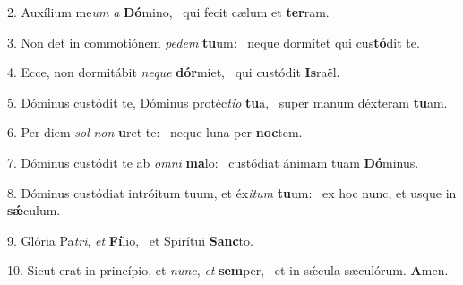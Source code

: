 2. Auxílium me\textit{um} \textit{a} \textbf{Dó}mino, \ast\  qui fecit cælum et \textbf{ter}ram.\

3. Non det in commotiónem \textit{pe}\textit{dem} \textbf{tu}um: \ast\  neque dormítet qui cus\textbf{tó}dit te.\

4. Ecce, non dormitábit \textit{ne}\textit{que} \textbf{dór}miet, \ast\  qui custódit \textbf{Is}raël.\

5. Dóminus custódit te, Dóminus protéc\textit{ti}\textit{o} \textbf{tu}a, \ast\  super manum déxteram \textbf{tu}am.\

6. Per diem \textit{sol} \textit{non} \textbf{u}ret te: \ast\  neque luna per \textbf{noc}tem.\

7. Dóminus custódit te ab \textit{om}\textit{ni} \textbf{ma}lo: \ast\  custódiat ánimam tuam \textbf{Dó}minus.\

8. Dóminus custódiat intróitum tuum, et éx\textit{i}\textit{tum} \textbf{tu}um: \ast\  ex hoc nunc, et usque in \textbf{sǽ}culum.\

9. Glória Pa\textit{tri}, \textit{et} \textbf{Fí}lio, \ast\  et Spirítui \textbf{Sanc}to.\

10. Sicut erat in princípio, et \textit{nunc}, \textit{et} \textbf{sem}per, \ast\  et in sǽcula sæculórum. \textbf{A}men.\

